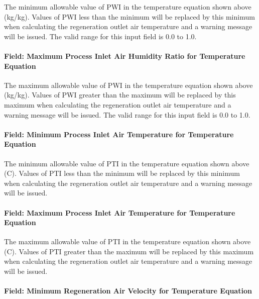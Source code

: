 The minimum allowable value of PWI in the temperature equation shown above (kg/kg). Values of PWI less than the minimum will be replaced by this minimum when calculating the regeneration outlet air temperature and a warning message will be issued. The valid range for this input field is 0.0 to 1.0.

\paragraph{Field: Maximum Process Inlet Air Humidity Ratio for Temperature Equation}\label{field-maximum-process-inlet-air-humidity-ratio-for-temperature-equation}

The maximum allowable value of PWI in the temperature equation shown above (kg/kg). Values of PWI greater than the maximum will be replaced by this maximum when calculating the regeneration outlet air temperature and a warning message will be issued. The valid range for this input field is 0.0 to 1.0.

\paragraph{Field: Minimum Process Inlet Air Temperature for Temperature Equation}\label{field-minimum-process-inlet-air-temperature-for-temperature-equation}

The minimum allowable value of PTI in the temperature equation shown above (C). Values of PTI less than the minimum will be replaced by this minimum when calculating the regeneration outlet air temperature and a warning message will be issued.

\paragraph{Field: Maximum Process Inlet Air Temperature for Temperature Equation}\label{field-maximum-process-inlet-air-temperature-for-temperature-equation}

The maximum allowable value of PTI in the temperature equation shown above (C). Values of PTI greater than the maximum will be replaced by this maximum when calculating the regeneration outlet air temperature and a warning message will be issued.

\paragraph{Field: Minimum Regeneration Air Velocity for Temperature Equation}\label{field-minimum-regeneration-air-velocity-for-temperature-equation}

